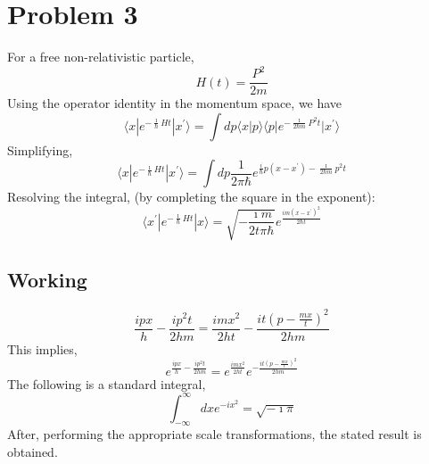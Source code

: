 \documentclass{article}
\begin{document}
\section{Problem 3}
For a free non-relativistic particle, $$H(t) = \frac{P^2}{2m}$$
Using the operator identity in the momentum space, we have
$$ \langle x | e^{-\frac{\imath}{\hbar}Ht} | x^{\prime} \rangle = \int dp \langle x |p \rangle  \langle p | e^{-\frac{\imath}{2\hbar m}P^2t} | x^{\prime} \rangle $$
Simplifying,
$$ \langle x | e^{-\frac{\imath}{\hbar}Ht} | x^{\prime} \rangle = \int dp \frac{1}{2\pi\hbar} e^{\frac{i}{\hbar}p\left(x-x^{\prime}\right)-\frac{\imath}{2\hbar m}p^2t}$$
Resolving the integral, (by completing the square in the exponent):
$$ \langle x^{\prime} | e^{-\frac{\imath}{\hbar}Ht} | x \rangle =\sqrt{-\frac{\imath m}{2 t \pi \hbar}} e^{\frac{i m (x-x^{\prime})^2}{2 \hbar t}}$$
\subsection{Working}
$$\frac{i p x}{h}-\frac{i p^2 t}{2 h m} = \frac{i m x^2}{2 h t}-\frac{i t \left(p-\frac{m x}{t}\right)^2}{2 h m}$$
This implies, 
$$e^{\frac{i p x}{h}-\frac{i p^2 t}{2 h m} }=e^{\frac{i m x^2}{2 h t}}e^{-\frac{i t \left(p-\frac{m x}{t}\right)^2}{2 h m}}$$
The following is a standard integral, 
$$\int_{-\infty}^{\infty} dx e^{-i x^2} = 	\sqrt{-\imath \pi}$$
After, performing the appropriate scale transformations, the stated result is obtained.
\end{document}
